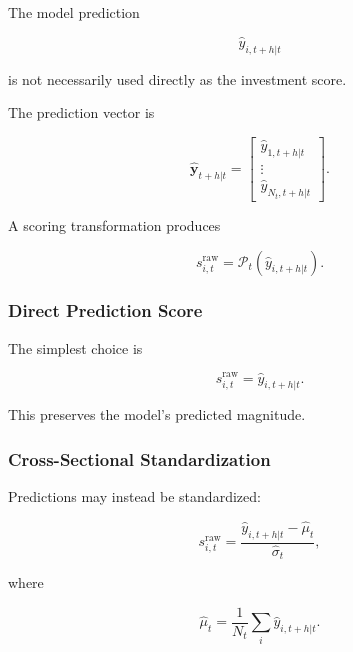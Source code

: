 \documentclass[11pt,a4paper]{article}
\begin{document}
The model prediction

\begin{equation}
\widehat{y}_{i,t+h|t}
\end{equation}

is not necessarily used directly as the investment score.

The prediction vector is

\begin{equation}
\widehat{\mathbf{y}}_{t+h|t}
=
\begin{bmatrix}
\widehat{y}_{1,t+h|t}
\\
\vdots
\\
\widehat{y}_{N_t,t+h|t}
\end{bmatrix}.
\end{equation}

A scoring transformation produces

\begin{equation}
\boxed{
s_{i,t}^{\mathrm{raw}}
=
\mathcal{P}_t
\left(
\widehat{y}_{i,t+h|t}
\right).
}
\end{equation}


\subsubsection{Direct Prediction Score}

The simplest choice is

\begin{equation}
\boxed{
s_{i,t}^{\mathrm{raw}}
=
\widehat{y}_{i,t+h|t}.
}
\end{equation}

This preserves the model's predicted magnitude.


\subsubsection{Cross-Sectional Standardization}

Predictions may instead be standardized:

\begin{equation}
s_{i,t}^{\mathrm{raw}}
=
\frac{
\widehat{y}_{i,t+h|t}
-
\widehat{\mu}_t
}{
\widehat{\sigma}_t
},
\end{equation}

where

\begin{equation}
\widehat{\mu}_t
=
\frac{1}{N_t}
\sum_i
\widehat{y}_{i,t+h|t}.
\end{equation}
\end{document}
